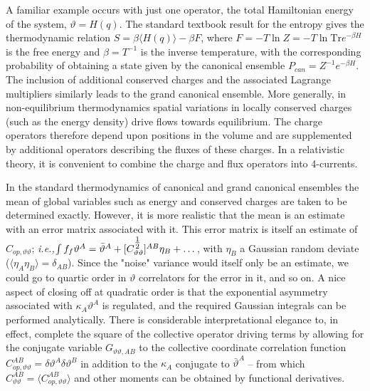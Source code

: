\documentclass[11pt,a4paper]{article}
\def\avrg#1{{\langle #1 \rangle}}
\def\half{{\textstyle{1\over2}}}
\def\ie{{\it i.e.,}}
\def\half{\textstyle{{1\over 2}}}
\begin{document}
 A familiar example occurs with just one operator, the total Hamiltonian energy of the system, $\vartheta = H(q)$.
The standard textbook result for the entropy gives the thermodynamic relation $S=\beta \avrg{H(q)} - \beta F$, where $F= -T \ln Z = -T \ln\mathrm{Tr}e^{-\beta H}$ is the free energy and $\beta=T^{-1} $ is the inverse temperature, with the corresponding probability of obtaining a state given by the canonical ensemble $P_{can} = Z^{-1}e^{-\beta H}$.
The inclusion of additional conserved charges and the associated Lagrange multipliers similarly leads to the grand canonical ensemble.
More generally, in non-equilibrium thermodynamics spatial variations in locally conserved charges (such as the energy density) drive flows towards equilibrium.
The charge operators therefore depend upon positions in the volume and are supplemented by additional operators describing the fluxes of these charges.
In a relativistic theory, it is convenient to combine the charge and flux operators into 4-currents.

In the standard thermodynamics of canonical and grand canonical ensembles the mean of global variables such as energy and conserved charges are taken to be determined exactly.
However, it is more realistic that the mean is an estimate with an error matrix associated with it.
This error matrix is itself an estimate of $C_{op,\vartheta \vartheta}$; \ie $\int f_f \vartheta^A = \bar{\vartheta}^A + [C_{\vartheta \vartheta}^{\half}]^{AB}\eta_B + \dots$, with $\eta_B$ a Gaussian random deviate ($\avrg{\eta_A \eta_B} =\delta_{AB}$). 
Since the "noise" variance would itself only be an estimate, we could go to quartic order in $\vartheta$ correlators for the error in it, and so on. 
A nice aspect of closing off at quadratic order is that the exponential asymmetry associated with $\kappa_A \vartheta^A$ is regulated, and the required Gaussian integrals can be performed analytically.
There is considerable interpretational elegance to, in effect, complete the square of the collective operator driving terms by allowing for the conjugate variable $G_{\vartheta \vartheta,AB}$ to the collective coordinate correlation function $C_{op,\vartheta \vartheta}^{AB}= \delta \vartheta^A \delta  \vartheta^B$ in addition to the $\kappa_A$ conjugate to $\bar{\vartheta}^A$ -- from which $C_{\vartheta \vartheta}^{AB}=\avrg{C_{op,\vartheta \vartheta}^{AB}}$ and other moments can be obtained by functional derivatives. 
\end{document}
